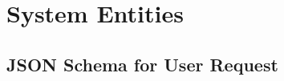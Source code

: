 %
%
%                 

\chapter{System Entities}
\label{sec:appendixa}



\section{JSON Schema for User Request}
